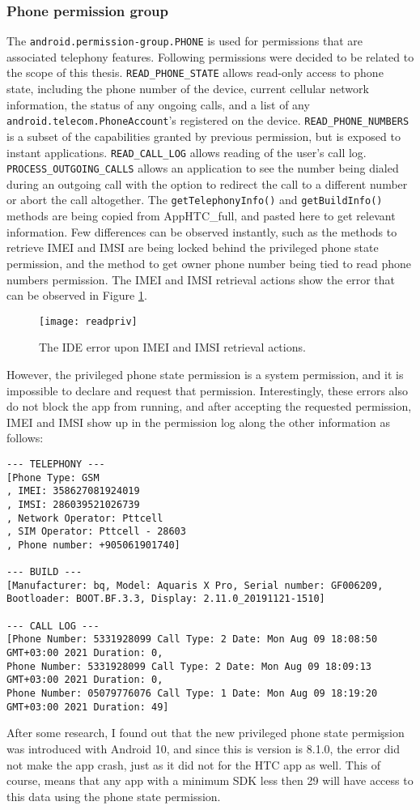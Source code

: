 \documentclass[
  a4paper,  %
  twoside,  %
  bibliography=totoc,
  headsepline,
  cleardoublepage=empty,
  parskip=half,
  draft=false,
  open=any
]{scrbook}
\begin{document}
\subsubsection{Phone permission group}
The \texttt{android.permission-group.PHONE} is used for permissions that are associated telephony features. Following permissions were decided to be related to the scope of this thesis. \texttt{READ\_PHONE\_STATE} allows read-only access to phone state, including the phone number of the device, current cellular network information, the status of any ongoing calls, and a list of any \texttt{android.telecom.PhoneAccount}'s registered on the device. \texttt{READ\_PHONE\_NUMBERS} is a subset of the capabilities granted by previous permission, but is exposed to instant applications. \texttt{READ\_CALL\_LOG} allows reading of the user's call log. \texttt{PROCESS\_OUTGOING\_CALLS} allows an application to see the number being dialed during an outgoing call with the option to redirect the call to a different number or
abort the call altogether. The \texttt{getTelephonyInfo()} and \texttt{getBuildInfo()} methods are being copied from AppHTC\_full, and pasted here to get relevant information. Few differences can be observed instantly, such as the methods to retrieve IMEI and IMSI are being locked behind the privileged phone state permission, and the method to get owner phone number being tied to read phone numbers permission. The IMEI and IMSI retrieval actions show the error that can be observed in Figure \ref{imerror}.
\begin{figure}[H]\centering
	\texttt{[image: readpriv]}
	\caption{The IDE error upon IMEI and IMSI retrieval actions.}
	\label{imerror}
\end{figure} 
However, the privileged phone state permission is a system permission, and it is impossible to declare and request that permission. Interestingly, these errors also do not block the app from running, and after accepting the requested permission, IMEI and IMSI show up in the permission log along the other information as follows:
\begin{lstlisting}
--- TELEPHONY --- 
[Phone Type: GSM
, IMEI: 358627081924019
, IMSI: 286039521026739
, Network Operator: Pttcell
, SIM Operator: Pttcell - 28603
, Phone number: +905061901740]

--- BUILD --- 
[Manufacturer: bq, Model: Aquaris X Pro, Serial number: GF006209, Bootloader: BOOT.BF.3.3, Display: 2.11.0_20191121-1510]

--- CALL LOG --- 
[Phone Number: 5331928099 Call Type: 2 Date: Mon Aug 09 18:08:50 GMT+03:00 2021 Duration: 0, 
Phone Number: 5331928099 Call Type: 2 Date: Mon Aug 09 18:09:13 GMT+03:00 2021 Duration: 0, 
Phone Number: 05079776076 Call Type: 1 Date: Mon Aug 09 18:19:20 GMT+03:00 2021 Duration: 49]
\end{lstlisting}
After some research, I found out that the new privileged phone state permişsion was introduced with Android 10, and since this is version is 8.1.0, the error did not make the app crash, just as it did not for the HTC app as well. This of course, means that any app with a minimum SDK less then 29 will have access to this data using the phone state permission.
\end{document}
